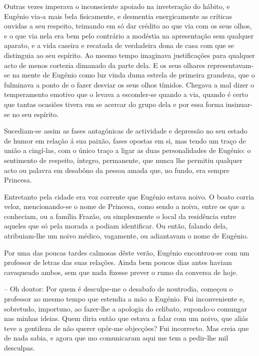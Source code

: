 \documentclass[9pt]{article}
\begin{document}
Outras vezes imperava o inconsciente apoiado na invetera\-ção do hábito,
e Eugé\-nio via-a mais bela fisicamente, e desmentia energicamente as críticas
ouvidas a seu respeito, teimando em só dar crédito ao que via com os seus
o\-lhos, e o que via nela era bem pelo contrário a modéstia na apresenta\-ção
sem qualquer aparato, e a vida caseira e recatada de verdadeira dona de casa
com que se distinguia ao seu espírito. Ao mesmo tempo imaginava justifi\-ca\-ções para qualquer acto de menos cortezia dimanado da parte dela. E os seus
o\-lhares representavam-se na mente de Eugé\-nio como luz vinda duma estrela
de primeira gran\-deza, que o fulminava a ponto de o fazer desviar os seus
o\-lhos tímidos. Chegava a mal dizer o temperamento emotivo que o levava a esconder-se quan\-do a via, quan\-do é certo que tantas ocasiões tivera em se acercar do grupo dela e por essa forma insinuar-se no seu espírito.

Sucediam-se assim as fases antagónicas de actividade e depressão no
seu estado de humor em rela\-ção á sua paixão, fases opostas em si, mas tendo
um traço de união a cingí-las, com o único traço a ligar as duas personalidades de Eugé\-nio: o sentimento de respeito, íntegro, permanente, que nunca lhe
permitiu qualquer acto ou palavra em desabôno da pessoa amada que, no fundo,
era sempre Princesa.

Entretanto pela cidade era voz corrente que Eugé\-nio estava noivo.
O boato corria veloz, mencionando-se o nome de Princesa, como sendo
a noiva, entre os que a conheciam, ou a fa\-mí\-lia Frazão, ou simplesmente o local da residência entre aqueles que só pela morada a podiam identifi\-car. Ou
então, falando dela, atribuiam-\-lhe um noivo médico, vagamente, ou adiantavam
o nome de Eugé\-nio.

Por uma das poucas tardes calmosas dêste verão, Eugé\-nio en\-con\-trou-se
com um professor de letras das suas rela\-ções. Ainda bem poucos dias antes
haviam cavaqueado ambos, sem que nada fizesse prever o rumo da conversa de
hoje.

-- Oh doutor: Por quem é desculpe-me o desabafo de noutrodia, começou
o professor ao mesmo tempo que estendia a mão a Eugé\-nio. Fui inconveniente
e, sobretudo, importuno, ao fazer-lhe a apologia do celibato, supondo-o comungar nas minhas ideias. Quem diria então que estava a falar com um noivo, que
aliás teve a gentileza de não querer opôr-me objec\-ções? Fui incorrecto.
Mas creia que de nada sabia, e agora que mo comunicaram aqui me tem a pedir-lhe mil desculpas.
\end{document}
